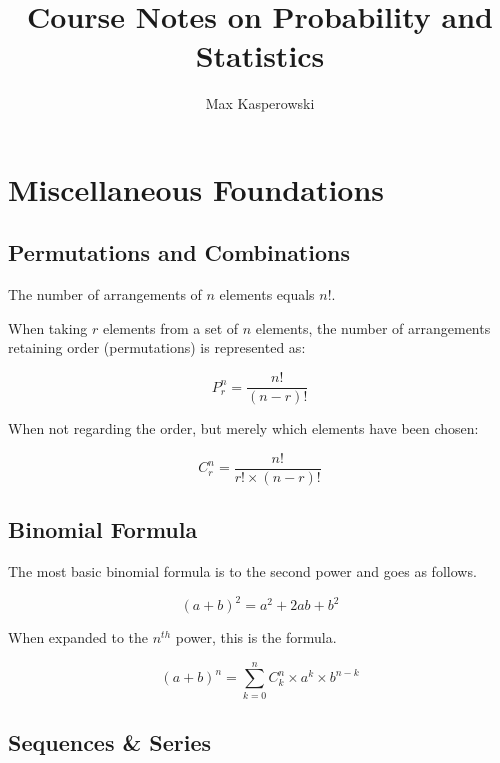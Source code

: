 \documentclass[a4paper, 10pt]{article}
\author{Max Kasperowski}
\title{Course Notes on Probability and Statistics}
\begin{document}
	\maketitle
	\tableofcontents
	\newpage

	\section{Miscellaneous Foundations}

	\subsection{Permutations and Combinations}

	The number of arrangements of \(n\) elements equals \(n!\).

	\noindent When taking \(r\) elements from a set of \(n\) elements, the number of arrangements retaining order (permutations) is represented as:

	\begin{equation*}
	P^{n}_{r}=\frac{n!}{(n-r)!}
	\end{equation*}

	\noindent When not regarding the order, but merely which elements have been chosen:

	\begin{equation*}
	C^{n}_{r}=\frac{n!}{r!\times (n-r)!}
	\end{equation*}

	\subsection{Binomial Formula}

	The most basic binomial formula is to the second power and goes as follows.

	\begin{equation*}
		(a+b)^2 = a^2+2ab+b^2
	\end{equation*}

	\noindent When expanded to the \(n^{th}\) power, this is the formula.

	\begin{equation*}
		(a+b)^n = \sum_{k=0}^{n}C^{n}_{k}\times a^k\times b^{n-k}
	\end{equation*}

	\subsection{Sequences \& Series}
\end{document}
